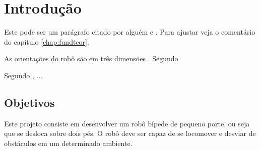 \chapter{Introdução}
\label{chap:intro}

Este pode ser um parágrafo citado por alguém \cite{Barabasi2003-1} e \cite{barabasi2003linked}.
Para ajustar veja o comentário do capítulo \ref{chap:fundteor}.

As orientações do robô são em três dimensões \cite{aperea-1}.
Segundo 

Segundo , ...

\section{Objetivos}
\label{sec:obj}


Este projeto consiste em desenvolver um robô bípede de pequeno porte, ou seja que se desloca sobre dois pés. O robô deve ser capaz de se locomover e desviar de obstáculos em um determinado ambiente. 
\label{sec:obj}




